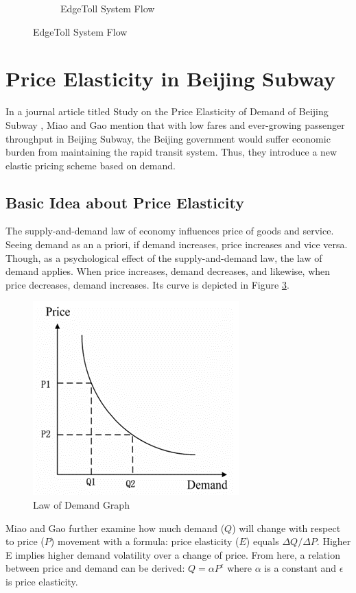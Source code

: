 \documentclass[a4paper,12pt,oneside, utf8x]{report}
\begin{document}
\begin{figure}[H]
\begin{subfigure}[b]{.44\textwidth}
            \caption{EdgeToll System Flow \cite{a18}}
            \label{f24et}
        \end{subfigure}
        \label{f2324}
    \end{figure}
    
\section{Price Elasticity in Beijing Subway \cite{a19}}

In a journal article titled Study on the Price Elasticity of Demand of Beijing Subway \cite{a19}, Miao and Gao mention that with low fares and ever-growing passenger throughput in Beijing Subway, the Beijing government would suffer economic burden from maintaining the rapid transit system. Thus, they introduce a new elastic pricing scheme based on demand.

\subsection{Basic Idea about Price Elasticity}
The supply-and-demand law of economy influences price of goods and service. Seeing demand as an a priori, if demand increases, price increases and vice versa. Though, as a psychological effect of the supply-and-demand law, the law of demand applies. When price increases, demand decreases, and likewise, when price decreases, demand increases. Its curve is depicted in Figure \ref{f25}.

    \begin{figure}[H]
        \centering
        \includegraphics[width=.35\textwidth]{figures/2-5.png}
        \caption{Law of Demand Graph \cite{a19}}
        \label{f25}
    \end{figure}
    
Miao and Gao further examine how much demand ($Q$) will change with respect to price ($P$) movement with a formula: price elasticity ($E$) equals $\Delta Q/ \Delta P$. Higher E implies higher demand volatility over a change of price. From here, a relation between price and demand can be derived: $Q = \alpha P^\epsilon$ where $\alpha$ is a constant and $\epsilon$ is price elasticity.
\end{document}
